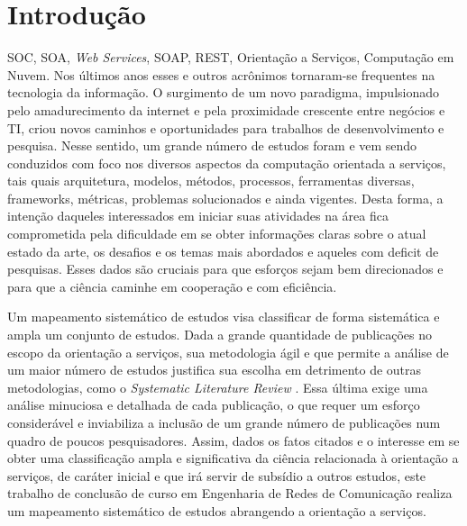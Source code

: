 
\section{Introdu\c{c}\~{a}o}\label{sec:introduction}

SOC, SOA, \textit{Web Services}, SOAP, REST, Orientação a Serviços, Computação em Nuvem. Nos últimos anos esses e outros acrônimos tornaram-se frequentes na tecnologia da informação. O surgimento de um novo paradigma, impulsionado pelo amadurecimento da internet e pela proximidade crescente entre negócios e TI, criou novos caminhos e oportunidades para trabalhos de desenvolvimento e pesquisa. Nesse sentido, um grande número de estudos foram e vem sendo conduzidos com foco nos diversos aspectos da computação orientada a serviços, tais quais arquitetura, modelos, métodos, processos, ferramentas diversas, frameworks, métricas, problemas solucionados e ainda vigentes. Desta forma, a intenção daqueles interessados em iniciar suas atividades na área fica comprometida pela dificuldade em se obter informações claras sobre o atual estado da arte, os desafios e os temas mais abordados e aqueles com deficit de pesquisas. Esses dados são cruciais para que esforços sejam bem direcionados e para que a ciência caminhe em cooperação e com eficiência.

Um mapeamento sistemático de estudos visa classificar de forma sistemática e ampla um conjunto de estudos. Dada a grande quantidade de publicações no escopo da orientação a serviços, sua metodologia ágil e que permite a análise de um maior número de estudos justifica sua escolha em detrimento de outras metodologias, como o \textit{Systematic Literature Review} \cite{Petersen_Feldt_Mujtaba_Mattsson_2007}. Essa última exige uma análise minuciosa e detalhada de cada publicação, o que requer um esforço considerável e inviabiliza a inclusão de um grande número de publicações num quadro de poucos pesquisadores. Assim, dados os fatos citados e o interesse em se obter uma classificação ampla e significativa da ciência relacionada à orientação a serviços, de caráter inicial e que irá servir de subsídio a outros estudos, este trabalho de conclusão de curso em Engenharia de Redes de Comunicação realiza um mapeamento sistemático de estudos abrangendo a orientação a serviços. 

